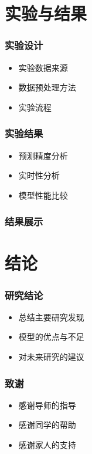 \documentclass{beamer}
\begin{document}
\section{实验与结果}
\begin{frame}
  \frametitle{实验设计}
  \begin{itemize}
    \item 实验数据来源
    \item 数据预处理方法
    \item 实验流程
  \end{itemize}
\end{frame}

\begin{frame}
  \frametitle{实验结果}
  \begin{itemize}
    \item 预测精度分析
    \item 实时性分析
    \item 模型性能比较
  \end{itemize}
\end{frame}

\begin{frame}
  \frametitle{结果展示}
\end{frame}

\section{结论}
\begin{frame}
  \frametitle{研究结论}
  \begin{itemize}
    \item 总结主要研究发现
    \item 模型的优点与不足
    \item 对未来研究的建议
  \end{itemize}
\end{frame}

\begin{frame}
  \frametitle{致谢}
  \begin{itemize}
    \item 感谢导师的指导
    \item 感谢同学的帮助
    \item 感谢家人的支持
  \end{itemize}
\end{frame}
\end{document}
